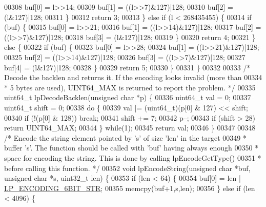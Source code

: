 \begin{DoxyCode}
00308             buf[0] = l>>14;
00309             buf[1] = ((l>>7)&127)|128;
00310             buf[2] = (l&127)|128;
00311         \}
00312         \textcolor{keywordflow}{return} 3;
00313     \} \textcolor{keywordflow}{else} \textcolor{keywordflow}{if} (l < 268435455) \{
00314         \textcolor{keywordflow}{if} (buf) \{
00315             buf[0] = l>>21;
00316             buf[1] = ((l>>14)&127)|128;
00317             buf[2] = ((l>>7)&127)|128;
00318             buf[3] = (l&127)|128;
00319         \}
00320         \textcolor{keywordflow}{return} 4;
00321     \} \textcolor{keywordflow}{else} \{
00322         \textcolor{keywordflow}{if} (buf) \{
00323             buf[0] = l>>28;
00324             buf[1] = ((l>>21)&127)|128;
00325             buf[2] = ((l>>14)&127)|128;
00326             buf[3] = ((l>>7)&127)|128;
00327             buf[4] = (l&127)|128;
00328         \}
00329         \textcolor{keywordflow}{return} 5;
00330     \}
00331 \}
00332 
00333 \textcolor{comment}{/* Decode the backlen and returns it. If the encoding looks invalid (more than}
00334 \textcolor{comment}{ * 5 bytes are used), UINT64\_MAX is returned to report the problem. */}
00335 uint64\_t lpDecodeBacklen(\textcolor{keywordtype}{unsigned} \textcolor{keywordtype}{char} *p) \{
00336     uint64\_t val = 0;
00337     uint64\_t shift = 0;
00338     \textcolor{keywordflow}{do} \{
00339         val |= (uint64\_t)(p[0] & 127) << shift;
00340         \textcolor{keywordflow}{if} (!(p[0] & 128)) \textcolor{keywordflow}{break};
00341         shift += 7;
00342         p--;
00343         \textcolor{keywordflow}{if} (shift > 28) \textcolor{keywordflow}{return} UINT64\_MAX;
00344     \} \textcolor{keywordflow}{while}(1);
00345     \textcolor{keywordflow}{return} val;
00346 \}
00347 
00348 \textcolor{comment}{/* Encode the string element pointed by 's' of size 'len' in the target}
00349 \textcolor{comment}{ * buffer 's'. The function should be called with 'buf' having always enough}
00350 \textcolor{comment}{ * space for encoding the string. This is done by calling lpEncodeGetType()}
00351 \textcolor{comment}{ * before calling this function. */}
00352 \textcolor{keywordtype}{void} lpEncodeString(\textcolor{keywordtype}{unsigned} \textcolor{keywordtype}{char} *buf, \textcolor{keywordtype}{unsigned} \textcolor{keywordtype}{char} *s, uint32\_t len) \{
00353     \textcolor{keywordflow}{if} (len < 64) \{
00354         buf[0] = len | \hyperlink{listpack_8c_aa03a77428cf5dd11a741306d35f08d6f}{LP\_ENCODING\_6BIT\_STR};
00355         memcpy(buf+1,s,len);
00356     \} \textcolor{keywordflow}{else} \textcolor{keywordflow}{if} (len < 4096) \{

\end{DoxyCode}
